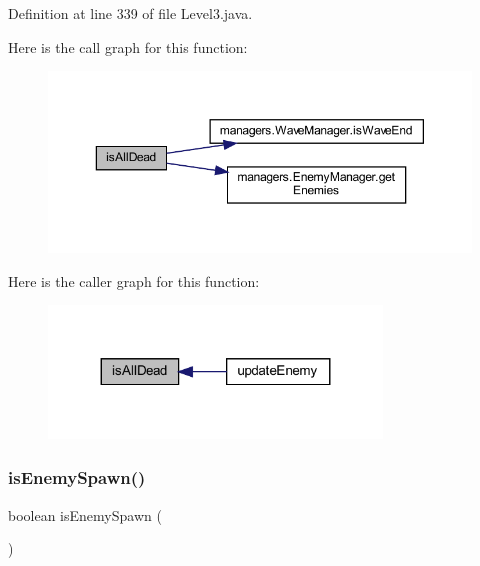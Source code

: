 Definition at line 339 of file Level3.\+java.

Here is the call graph for this function\+:
\nopagebreak
\begin{figure}[H]
\begin{center}
\leavevmode
\includegraphics[width=350pt]{classscenes_1_1_level3_acd1846d50c3d8678777f9ab6716f5cf3_cgraph}
\end{center}
\end{figure}
Here is the caller graph for this function\+:\nopagebreak
\begin{figure}[H]
\begin{center}
\leavevmode
\includegraphics[width=251pt]{classscenes_1_1_level3_acd1846d50c3d8678777f9ab6716f5cf3_icgraph}
\end{center}
\end{figure}
\mbox{\label{classscenes_1_1_level3_a121827ebd1c5b24c92f966721b51c0b9}} 
\subsubsection{\texorpdfstring{is\+Enemy\+Spawn()}{isEnemySpawn()}}
{\footnotesize\ttfamily boolean is\+Enemy\+Spawn (\begin{DoxyParamCaption}{ }\end{DoxyParamCaption})\hspace{0.3cm}{\ttfamily [private]}}



